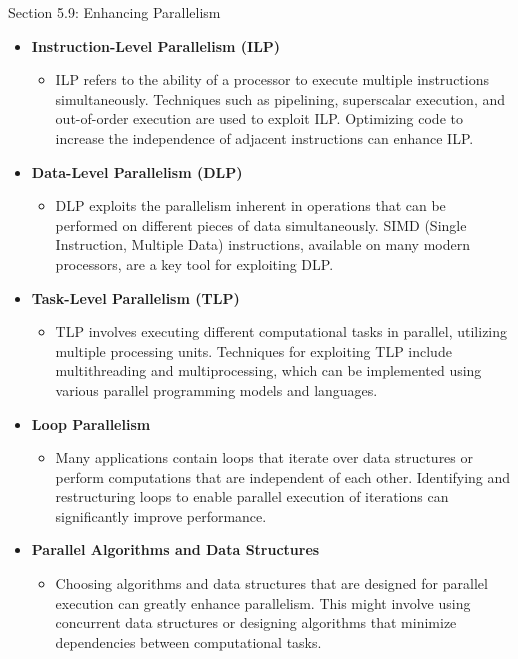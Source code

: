 \begin{notes}{Section 5.9: Enhancing Parallelism}
    \begin{itemize}
        \item \textbf{Instruction-Level Parallelism (ILP)}
        \begin{itemize}
            \item ILP refers to the ability of a processor to execute multiple instructions simultaneously. Techniques such as pipelining, superscalar execution, and out-of-order execution are used 
            to exploit ILP. Optimizing code to increase the independence of adjacent instructions can enhance ILP.
        \end{itemize}
        \item \textbf{Data-Level Parallelism (DLP)}
        \begin{itemize}
            \item DLP exploits the parallelism inherent in operations that can be performed on different pieces of data simultaneously. SIMD (Single Instruction, Multiple Data) instructions, available 
            on many modern processors, are a key tool for exploiting DLP.
        \end{itemize}
        \item \textbf{Task-Level Parallelism (TLP)}
        \begin{itemize}
            \item TLP involves executing different computational tasks in parallel, utilizing multiple processing units. Techniques for exploiting TLP include multithreading and multiprocessing, which 
            can be implemented using various parallel programming models and languages.
        \end{itemize}
        \item \textbf{Loop Parallelism}
        \begin{itemize}
            \item Many applications contain loops that iterate over data structures or perform computations that are independent of each other. Identifying and restructuring loops to enable parallel 
            execution of iterations can significantly improve performance.
        \end{itemize}
        \item \textbf{Parallel Algorithms and Data Structures}
        \begin{itemize}
            \item Choosing algorithms and data structures that are designed for parallel execution can greatly enhance parallelism. This might involve using concurrent data structures or designing 
            algorithms that minimize dependencies between computational tasks.
        \end{itemize}
    \end{itemize}
    

\end{notes}

